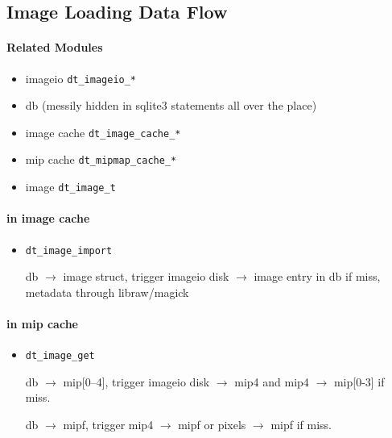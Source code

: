 \documentclass[a4paper,twoside]{scrartcl}
\newcommand{\code}[1]{\texttt{\color{codecol}#1}}
\begin{document}
\newpage
\subsection{Image Loading Data Flow}

\paragraph{Related Modules}
\begin{itemize}
  \item imageio \code{dt\_imageio\_*}
  \item db (messily hidden in sqlite3 statements all over the place)
  \item image cache \code{dt\_image\_cache\_*}
  \item mip cache \code{dt\_mipmap\_cache\_*}
  \item image \code{dt\_image\_t}
\end{itemize}

\paragraph{in image cache}
\begin{itemize}
  \item \code{dt\_image\_import}

  db $\rightarrow$ image struct, trigger imageio disk $\rightarrow$ image entry in db if miss,
                metadata through libraw/magick
  
 
\end{itemize}

\paragraph{in mip cache}
\begin{itemize}
  \item \code{dt\_image\_get}

      db $\rightarrow$ mip[0--4], trigger imageio disk $\rightarrow$ mip4 and mip4 $\rightarrow$ mip[0-3] if miss.

  
      db $\rightarrow$ mipf, trigger mip4 $\rightarrow$ mipf or pixels $\rightarrow$ mipf if miss.
\end{itemize}
\end{document}
